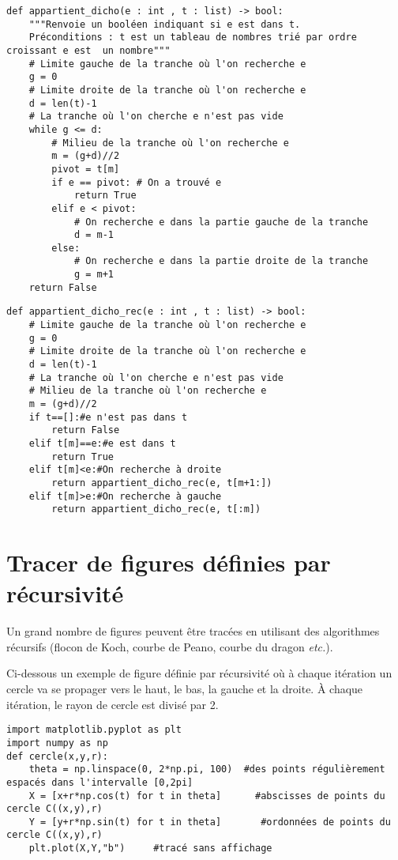 \begin{lstlisting}
def appartient_dicho(e : int , t : list) -> bool:
    """Renvoie un booléen indiquant si e est dans t. 
    Préconditions : t est un tableau de nombres trié par ordre croissant e est  un nombre"""
    # Limite gauche de la tranche où l'on recherche e
    g = 0 
    # Limite droite de la tranche où l'on recherche e
    d = len(t)-1 
    # La tranche où l'on cherche e n'est pas vide
    while g <= d: 
        # Milieu de la tranche où l'on recherche e
        m = (g+d)//2 
        pivot = t[m]
        if e == pivot: # On a trouvé e
            return True
        elif e < pivot:
            # On recherche e dans la partie gauche de la tranche
            d = m-1 
        else:
            # On recherche e dans la partie droite de la tranche
            g = m+1 
    return False
\end{lstlisting}

\begin{lstlisting}
def appartient_dicho_rec(e : int , t : list) -> bool:
    # Limite gauche de la tranche où l'on recherche e
    g = 0
    # Limite droite de la tranche où l'on recherche e
    d = len(t)-1
    # La tranche où l'on cherche e n'est pas vide
    # Milieu de la tranche où l'on recherche e
    m = (g+d)//2
    if t==[]:#e n'est pas dans t
        return False
    elif t[m]==e:#e est dans t
        return True
    elif t[m]<e:#On recherche à droite
        return appartient_dicho_rec(e, t[m+1:])
    elif t[m]>e:#On recherche à gauche
        return appartient_dicho_rec(e, t[:m])
\end{lstlisting}

\section{Tracer de figures définies par récursivité}
Un grand nombre de figures peuvent être tracées en utilisant des algorithmes récursifs (flocon de Koch, courbe de Peano, courbe du dragon \textit{etc.}).

Ci-dessous un exemple de figure définie par récursivité où à chaque itération un cercle va se propager vers le haut, le bas, la gauche et la droite. À chaque itération, le rayon de cercle est divisé par 2. 
\begin{lstlisting}
import matplotlib.pyplot as plt
import numpy as np
def cercle(x,y,r):
    theta = np.linspace(0, 2*np.pi, 100)  #des points régulièrement espacés dans l'intervalle [0,2pi]
    X = [x+r*np.cos(t) for t in theta]      #abscisses de points du cercle C((x,y),r)
    Y = [y+r*np.sin(t) for t in theta]       #ordonnées de points du cercle C((x,y),r)
    plt.plot(X,Y,"b")     #tracé sans affichage
\end{lstlisting}



